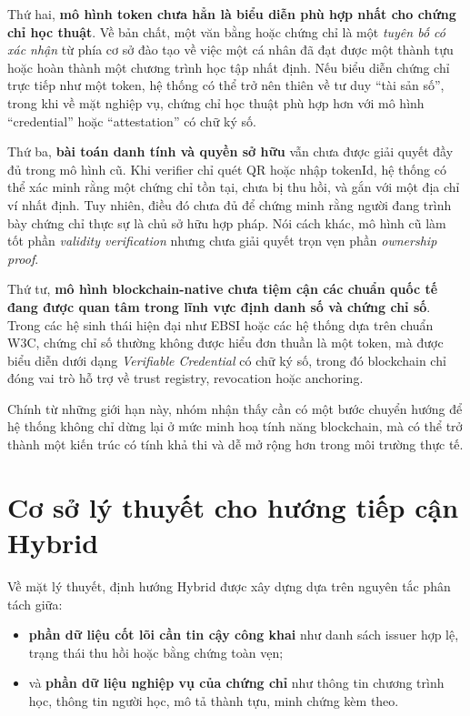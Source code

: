 Thứ hai, \textbf{mô hình token chưa hẳn là biểu diễn phù hợp nhất cho chứng chỉ học thuật}. Về bản chất, một văn bằng hoặc chứng chỉ là một \textit{tuyên bố có xác nhận} từ phía cơ sở đào tạo về việc một cá nhân đã đạt được một thành tựu hoặc hoàn thành một chương trình học tập nhất định. Nếu biểu diễn chứng chỉ trực tiếp như một token, hệ thống có thể trở nên thiên về tư duy ``tài sản số'', trong khi về mặt nghiệp vụ, chứng chỉ học thuật phù hợp hơn với mô hình ``credential'' hoặc ``attestation'' có chữ ký số.

Thứ ba, \textbf{bài toán danh tính và quyền sở hữu} vẫn chưa được giải quyết đầy đủ trong mô hình cũ. Khi verifier chỉ quét QR hoặc nhập tokenId, hệ thống có thể xác minh rằng một chứng chỉ tồn tại, chưa bị thu hồi, và gắn với một địa chỉ ví nhất định. Tuy nhiên, điều đó chưa đủ để chứng minh rằng người đang trình bày chứng chỉ thực sự là chủ sở hữu hợp pháp. Nói cách khác, mô hình cũ làm tốt phần \textit{validity verification} nhưng chưa giải quyết trọn vẹn phần \textit{ownership proof}.

Thứ tư, \textbf{mô hình blockchain-native chưa tiệm cận các chuẩn quốc tế đang được quan tâm trong lĩnh vực định danh số và chứng chỉ số}. Trong các hệ sinh thái hiện đại như EBSI hoặc các hệ thống dựa trên chuẩn W3C, chứng chỉ số thường không được hiểu đơn thuần là một token, mà được biểu diễn dưới dạng \textit{Verifiable Credential} có chữ ký số, trong đó blockchain chỉ đóng vai trò hỗ trợ về trust registry, revocation hoặc anchoring.

Chính từ những giới hạn này, nhóm nhận thấy cần có một bước chuyển hướng để hệ thống không chỉ dừng lại ở mức minh hoạ tính năng blockchain, mà có thể trở thành một kiến trúc có tính khả thi và dễ mở rộng hơn trong môi trường thực tế.

\section{Cơ sở lý thuyết cho hướng tiếp cận Hybrid}

Về mặt lý thuyết, định hướng Hybrid được xây dựng dựa trên nguyên tắc phân tách giữa:
\begin{itemize}
    \item \textbf{phần dữ liệu cốt lõi cần tin cậy công khai} như danh sách issuer hợp lệ, trạng thái thu hồi hoặc bằng chứng toàn vẹn;
    \item và \textbf{phần dữ liệu nghiệp vụ của chứng chỉ} như thông tin chương trình học, thông tin người học, mô tả thành tựu, minh chứng kèm theo.
\end{itemize}

